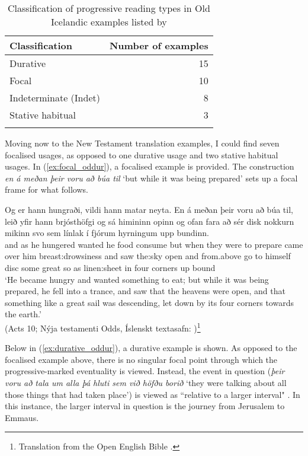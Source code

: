\documentclass[output=paper,colorlinks,citecolor=brown]{langscibook}
\begin{document}
\begin{table}
\begin{tabular}{lr}
\lsptoprule
Classification & Number of examples \\ 
\midrule
Durative                 & 15  \\
Focal                    & 10  \\
Indeterminate (Indet)    & 8   \\
Stative habitual         & 3   \\
\lspbottomrule
\end{tabular}
\caption{Classification of progressive reading types in Old Icelandic examples listed by \citet{benediktsson1976isl}}
\label{tab:classification}
\end{table}

Moving now to the New Testament translation examples, I could find seven focalised usages, as opposed to one durative usage and two stative habitual usages. In (\ref{ex:focal_oddur}), a focalised example is provided. The   construction \textit{en á meðan þeir voru að búa til} `but while it was being prepared' sets up a focal frame for what follows.

\ea\label{ex:focal_oddur} 
\gll Og er hann hungraði, vildi hann matar neyta. En á meðan þeir voru að búa til, leið yfir hann brjósthöfgi og sá himininn opinn og ofan fara að sér disk nokkurn mikinn svo sem línlak í fjórum hyrningum upp bundinn.  \\
and as he hungered wanted he food consume but when {} they were to prepare {} came over him breast:drowsiness and saw the:sky open and from.above go to himself disc some great so as linen:sheet in four corners up bound\\
\glt `He became hungry and wanted something to eat; but while it was being prepared, he fell into a trance, and saw that the heavens were open, and that something like a great sail was descending, let down by its four corners towards the earth.' \\ \hfill (Acts 10; Nýja testamenti Odds, Íslenskt textasafn: \citeauthor{IslensktTextasafn2019} \citeyear{IslensktTextasafn2019})\footnote{Translation from the Open English Bible \citep{oeb2022}.} \z

Below in (\ref{ex:durative_oddur}), a durative example is shown. As opposed to the focalised example above, there is no singular focal point through which the progressive-marked eventuality is viewed. Instead, the event in question (\textit{þeir voru að tala um alla þá hluti sem við höfðu borið} `they were talking about all those things that had taken place') is viewed as ``relative to a larger interval" \citep[527]{bertinetto2000progressive}. In this instance, the larger interval in question is the journey from Jerusalem to Emmaus.
\end{document}
